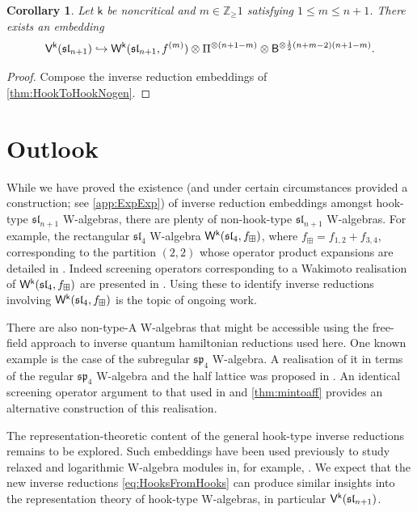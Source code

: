 \documentclass[10pt,a4paper]{amsart}
\numberwithin{equation}{section}
\newcommand{\kk}{\mathsf{k}}   %
\DeclarePairedDelimiter{\brac}{\lparen}{\rparen}   %
\newcommand{\fld}[1]{\mathbb{#1}}    %
\newcommand{\alg}[1]{\mathfrak{#1}}  %
\newcommand{\VOA}[1]{\mathsf{#1}}    %
\newcommand{\ZZ}{\fld{Z}}
\newcommand{\SLA}[2]{\alg{#1}_{#2}}                      %
\newcommand{\slfour}{\SLA{sl}{4}}
\newcommand{\slnpone}{\SLA{sl}{n+1}}
\newcommand{\frec}{f_\boxplus}                                     %
\newcommand{\fhook}[1]{f^{(#1)}}                                  %
\newcommand{\Wsymb}{\VOA{W}}
\newcommand{\uaffvoa}[2]{\VOA{V}^{#1}\brac{#2}}                   %
\newcommand{\bgvoa}{\VOA{B}}                                      %
\newcommand{\uQHR}[3]{\Wsymb^{#1}\brac{#2,#3}}                    %
\theoremstyle{plain}
\newtheorem{corollary}[theorem]{Corollary}
\begin{document}
\begin{corollary}
Let $\kk$ be noncritical and $m \in \ZZ_\geq 1$ satisfying $1 \leq m \leq n+1$. There exists an embedding 
%
\begin{equation} \label{eq:AffFromHooks}
    \uaffvoa{\kk}{\slnpone} \hookrightarrow \uQHR{\kk}{\slnpone}{\fhook{m}}  \otimes \Pi^{\otimes (n+1-m)} \otimes  \bgvoa^{\otimes \frac{1}{2}(n+m-2)(n+1-m)}.
\end{equation}
%
\end{corollary}
\begin{proof}
    Compose the inverse reduction embeddings of \cref{thm:HookToHookNogen}.
\end{proof}

\section{Outlook}  \label{sec:Outlook}
While we have proved the existence (and under certain circumstances provided a construction; see \cref{app:ExpExp}) of inverse reduction embeddings amongst hook-type $\slnpone$ W-algebras, there are plenty of non-hook-type $\slnpone$ W-algebras. For example, the rectangular $\slfour$ W-algebra $\uQHR{\kk}{\slfour}{\frec}$, where $\frec = f_{1,2}+f_{3,4}$, corresponding to the partition $(2,2)$ whose operator product expansions are detailed in \cite[Sec.~2.2]{Ada21Certain}. Indeed screening operators corresponding to a Wakimoto realisation of $\uQHR{\kk}{\slfour}{\frec}$ are presented in \cite[App.~A.1]{CreCorr20}. Using these to identify inverse reductions involving $\uQHR{\kk}{\slfour}{\frec}$ is the topic of ongoing work.

There are also non-type-A W-algebras that might be accessible using the free-field approach to inverse quantum hamiltonian reductions used here. One known example is the case of the subregular $\mathfrak{sp}_4$ W-algebra. A realisation of it in terms of the regular $\mathfrak{sp}_4$ W-algebra and the half lattice was proposed in \cite{Beem21}. An identical screening operator argument to that used in \cite[Thm.~3.3]{Feh21c} and \cref{thm:mintoaff} provides an alternative construction of this realisation. 

The representation-theoretic content of the general hook-type inverse reductions remains to be explored. Such embeddings have been used previously to study relaxed and logarithmic W-algebra modules in, for example, \cite{AdaRea17,AdaRea20,Feh21c,ACG21}. We expect that the new inverse reductions \eqref{eq:HooksFromHooks} can produce similar insights into the representation theory of hook-type W-algebras, in particular $\uaffvoa{\kk}{\slnpone}$. 
\end{document}
